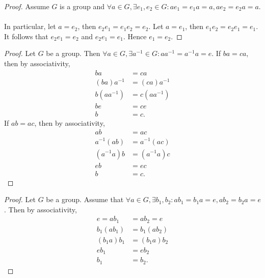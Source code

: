 \documentclass{article}
\newtheorem{theorem}{Theorem}[section]
\theoremstyle{definition}
\begin{document}
\begin{proof}
    Assume $G$ is a group and $\forall a \in G, \exists e_1,e_2 \in G: ae_1=e_1a = a, ae_2=e_2a=a$.
    \\ \\
    In particular, let $a=e_2$, then $e_2e_1 = e_1e_2 = e_2$. Let $a=e_1$, then $e_1e_2 = e_2e_1 = e_1$. It follows that $e_2e_1 = e_2$ and $e_2e_1 = e_1$. Hence $e_1=e_2$.
\end{proof}

\noindent{}

\begin{proof}
    Let $G$ be a group. Then $\forall a \in G, \exists a^{-1} \in G: aa^{-1}=a^{-1}a=e$. If $ba = ca$, then by associativity,
    \begin{align*}
        ba &= ca \\
        (ba)a^{-1} &= (ca)a^{-1} \\
        b(aa^{-1}) &= c(aa^{-1}) \\
        be &= ce \\
        b &= c.
    \end{align*}
    If $ab = ac$, then by associativity,
    \begin{align*}
        ab &= ac \\
        a^{-1}(ab) &= a^{-1}(ac) \\
        (a^{-1}a)b &= (a^{-1}a)c \\
        eb &= ec \\
        b &= c.
    \end{align*}
\end{proof}

\noindent{}

\begin{proof}
    Let $G$ be a group. Assume that $\forall a \in G, \exists b_1,b_2: ab_1=b_1a=e, ab_2=b_2a=e$. Then by associativity,
    \begin{align*}
        e = ab_1 &= ab_2 = e \\
        b_1(ab_1) &= b_1(ab_2) \\
        (b_1a)b_1 &= (b_1a)b_2 \\
        eb_1 &= eb_2 \\
        b_1 &= b_2.
    \end{align*}
\end{proof}
\end{document}
